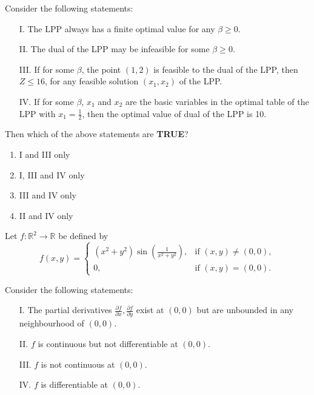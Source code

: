 Consider the following statements:

\begin{itemize}
    \item[I.] The LPP always has a finite optimal value for any \( \beta \geq 0 \).
    \item[II.] The dual of the LPP may be infeasible for some \( \beta \geq 0 \).
    \item[III.] If for some \( \beta \), the point \( (1,2) \) is feasible to the dual of the LPP, then \( Z \leq 16 \), for any feasible solution \( (x_1, x_2) \) of the LPP.
    \item[IV.] If for some \( \beta \), \( x_1 \) and \( x_2 \) are the basic variables in the optimal table of the LPP with \( x_1 = \frac{1}{2} \), then the optimal value of dual of the LPP is 10.
\end{itemize}

Then which of the above statements are \textbf{TRUE}?

\begin{enumerate}
    \item I and III only
    \item I, III and IV only
    \item III and IV only
    \item II and IV only
\end{enumerate}
\vspace{0.5cm}
\item Let \( f : \mathbb{R}^2 \rightarrow \mathbb{R} \) be defined by
\[
f(x, y) = \begin{cases} 
      (x^2 + y^2) \sin \left( \frac{1}{x^2 + y^2} \right), & \text{if } (x, y) \neq (0,0), \\
      0, & \text{if } (x, y) = (0,0).
   \end{cases}
\]

Consider the following statements:

\begin{itemize}
    \item[I.] The partial derivatives \( \frac{\partial f}{\partial x}, \frac{\partial f}{\partial y} \) exist at \( (0, 0) \) but are unbounded in any neighbourhood of \( (0, 0) \).
    \item[II.] \( f \) is continuous but not differentiable at \( (0, 0) \).
    \item[III.] \( f \) is not continuous at \( (0, 0) \).
    \item[IV.] \( f \) is differentiable at \( (0, 0) \).
\end{itemize}

